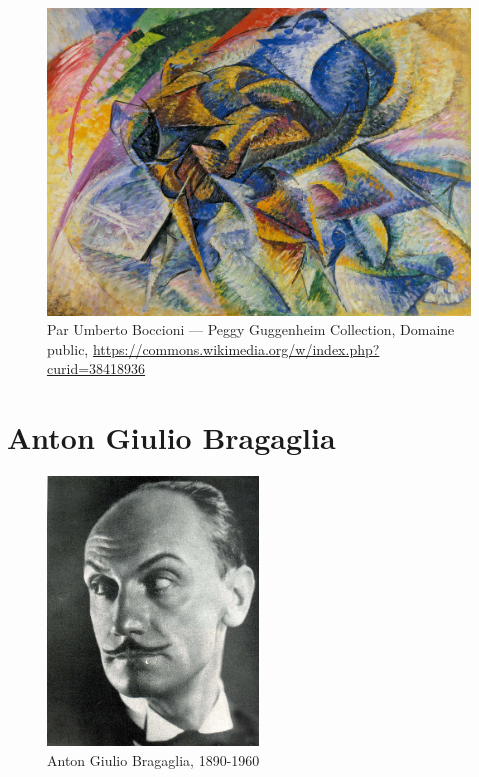 \documentclass[
  french,
]{book}
\begin{document}
\begin{figure}
\centering
\includegraphics{medias/corpus/boccioni/Umberto_Boccioni,_1913,_Dynamism_of_a_Cyclist_(Dinamismo_di_un_ciclista),_oil_on_canvas,_70_x_95_cm,_Gianni_Mattioli_Collection,_on_long-term_loan_to_the_Peggy_Guggenheim_Collection,_Venice.jpg}
\caption{Par Umberto Boccioni --- Peggy Guggenheim Collection, Domaine public, \url{https://commons.wikimedia.org/w/index.php?curid=38418936}}
\end{figure}

\hypertarget{anton-giulio-bragaglia}{%
\section{Anton Giulio Bragaglia}\label{anton-giulio-bragaglia}}

\begin{figure}
\centering
\includegraphics[width=0.5\textwidth,height=\textheight]{medias/corpus/bragaglia/Bragaglia_a_giulio.jpg}
\caption{Anton Giulio Bragaglia, 1890-1960}
\end{figure}
\end{document}
